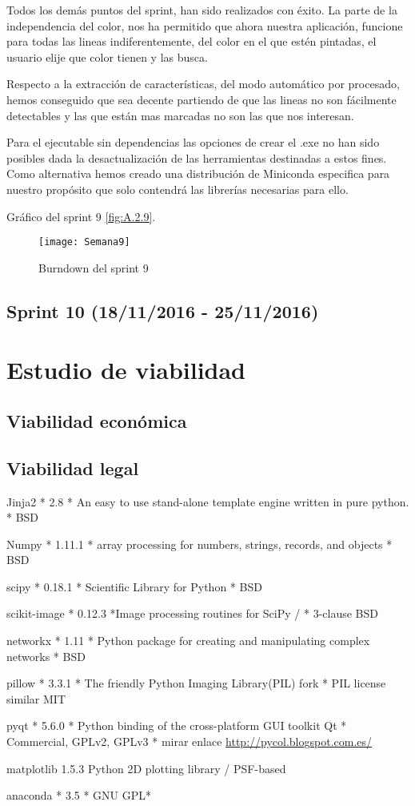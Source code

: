 Todos los demás puntos del sprint, han sido realizados con éxito.
La parte de la independencia del color, nos ha permitido que ahora nuestra aplicación, funcione para todas las lineas indiferentemente, del color en el que estén pintadas, el usuario elije que color tienen y las busca.

Respecto a la extracción de características, del modo automático por procesado, hemos conseguido que sea decente partiendo de que las lineas no son fácilmente detectables y las que están mas marcadas no son las que nos interesan.

Para el ejecutable sin dependencias las opciones de crear el .exe no han sido posibles dada la desactualización de las herramientas destinadas a estos fines.
Como alternativa hemos creado una distribución de Miniconda especifica para nuestro propósito que solo contendrá las librerías necesarias para ello.

Gráfico del sprint 9 \ref{fig:A.2.9}.
\begin{figure}[h]
\centering
\texttt{[image: Semana9]}
\caption{Burndown del sprint 9}
\label{fig:A.2.7}
\end{figure}


\subsection{Sprint 10 (18/11/2016 - 25/11/2016)}


\section{Estudio de viabilidad}

\subsection{Viabilidad económica}

\subsection{Viabilidad legal}

Jinja2 * 2.8 * An easy to use stand-alone template engine written in pure python. * BSD

Numpy * 1.11.1 * array processing for numbers, strings, records, and objects * BSD

scipy * 0.18.1 *	Scientific Library for Python * BSD

scikit-image *	0.12.3 *Image processing routines for SciPy / * 3-clause BSD

networkx * 1.11	* Python package for creating and manipulating complex networks * BSD

pillow * 3.3.1 * The friendly Python Imaging Library(PIL) fork *  PIL license similar MIT

pyqt * 5.6.0 * Python binding of the cross-platform GUI toolkit Qt * Commercial, GPLv2, GPLv3 * mirar enlace \url{http://pycol.blogspot.com.es/}

matplotlib	1.5.3	Python 2D plotting library / PSF-based

anaconda * 3.5 * GNU GPL*


